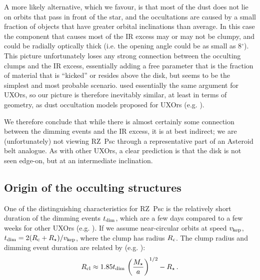 \documentclass[]{rsos}
\begin{document}
A more likely alternative, which we favour, is that most of the dust does not lie on
orbits that pass in front of the star, and the occultations are caused by a small
fraction of objects that have greater orbital inclinations than average. In this case the
component that causes most of the IR excess may or may not be clumpy, and could be
radially optically thick (i.e. the opening angle could be as small as 8$^\circ$). This
picture unfortunately loses any strong connection between the occulting clumps and the IR
excess, essentially adding a free parameter that is the fraction of material that is
``kicked'' or resides above the disk, but seems to be the simplest and most probable
scenario. \cite{2003ApJ...594L..47D} used essentially the same argument for UXOrs, so
our picture is therefore inevitably similar, at least in terms of geometry, as dust
occultation models proposed for UXOrs
(e.g. \cite{1997ApJ...491..885N,2000A&A...364..633N,2003ApJ...594L..47D}).

We therefore conclude that while there is almost certainly some connection between the
dimming events and the IR excess, it is at best indirect; we are (unfortunately) not
viewing RZ~Psc through a representative part of an Asteroid belt analogue. As with other
UXOrs, a clear prediction is that the disk is not seen edge-on, but at an intermediate
inclination.

\subsection{Origin of the occulting structures}\label{ss:orig}

One of the distinguishing characteristics for RZ~Psc is the relatively short duration of
the dimming events $t_{\rm dim}$, which are a few days compared to a few weeks for other
UXOrs (e.g. \cite{1999AJ....118.1043H,2010A&A...511L...9C}). If we assume near-circular
orbits at speed $v_{\rm kep}$, $t_{\rm dim}=2(R_{\rm c}+R_\star)/v_{\rm kep}$, where the
clump has radius $R_{\rm c}$.  The clump radius and dimming event duration are related by
(e.g. \cite{2016ApJ...816...69A,2016MNRAS.457.3988B}):
\begin{equation}
  R_{\rm cl} \approx 1.85 t_{\rm dim} \, \left( \frac{M_\star}{a} \right)^{1/2} - R_\star \, .
\end{equation}

\end{document}
